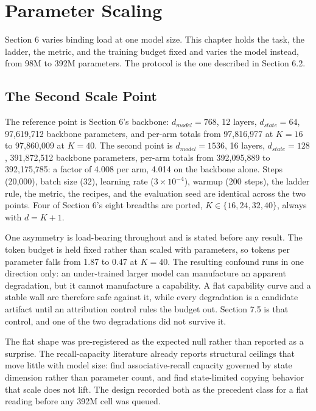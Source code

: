 \section{Parameter Scaling}

Section 6 varies binding load at one model size. This chapter holds the
task, the ladder, the metric, and the training budget fixed and varies
the model instead, from 98M to 392M parameters. The protocol is the one
described in Section 6.2.

\subsection{The Second Scale Point}

The reference point is Section 6's backbone: $d_{model}=768$, 12 layers,
$d_{state}=64$, 97,619,712 backbone parameters, and per-arm totals from
97,816,977 at $K{=}16$ to 97,860,009 at $K{=}40$. The second point is
$d_{model}=1536$, 16 layers, $d_{state}=128$, 391,872,512 backbone
parameters, per-arm totals from 392,095,889 to 392,175,785: a factor of
4.008 per arm, 4.014 on the backbone alone. Steps (20,000), batch size
(32), learning rate ($3 \times 10^{-4}$), warmup (200 steps), the ladder
rule, the metric, the recipes, and the evaluation seed are identical
across the two points. Four of Section 6's eight breadths are ported,
$K \in \{16, 24, 32, 40\}$, always with $d = K{+}1$.

One asymmetry is load-bearing throughout and is stated before any
result. The token budget is held fixed rather than scaled with
parameters, so tokens per parameter falls from 1.87 to 0.47 at $K{=}40$.
The resulting confound runs in one direction only: an under-trained
larger model can manufacture an apparent degradation, but it cannot
manufacture a capability. A flat capability curve and a stable wall are
therefore safe against it, while every degradation is a candidate
artifact until an attribution control rules the budget out. Section 7.5
is that control, and one of the two degradations did not survive it.

The flat shape was pre-registered as the expected null rather than
reported as a surprise. The recall-capacity literature already reports
structural ceilings that move little with model size: \citet{arora2023zoologymeasuringimprovingrecall}
find associative-recall capacity governed by state dimension
rather than parameter count, and \citet{jelassi2024repeatmetransformersbetter} find
state-limited copying behavior that scale does not lift. The design
recorded both as the precedent class for a flat reading before any 392M
cell was queued.

